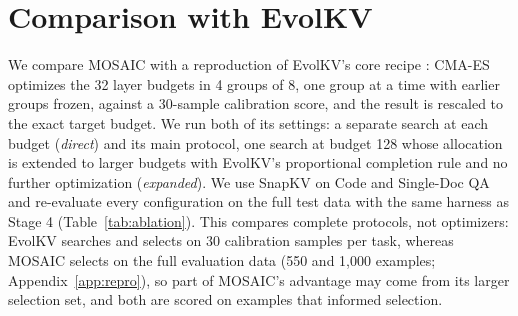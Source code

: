 \documentclass[11pt]{article}
\begin{document}
\section{Comparison with EvolKV}
\label{sec:evolkv}

We compare MOSAIC with a reproduction of EvolKV's core recipe \citep{yu2025evolkv}: CMA-ES optimizes the 32 layer budgets in 4 groups of 8, one group at a time with earlier groups frozen, against a 30-sample calibration score, and the result is rescaled to the exact target budget. We run both of its settings: a separate search at each budget (\emph{direct}) and its main protocol, one search at budget 128 whose allocation is extended to larger budgets with EvolKV's proportional completion rule and no further optimization (\emph{expanded}). We use SnapKV on Code and Single-Doc QA and re-evaluate every configuration on the full test data with the same harness as Stage 4 (Table~\ref{tab:ablation}). This compares complete protocols, not optimizers: EvolKV searches and selects on 30 calibration samples per task, whereas MOSAIC selects on the full evaluation data (550 and 1{,}000 examples; Appendix~\ref{app:repro}), so part of MOSAIC's advantage may come from its larger selection set, and both are scored on examples that informed selection.
\end{document}

